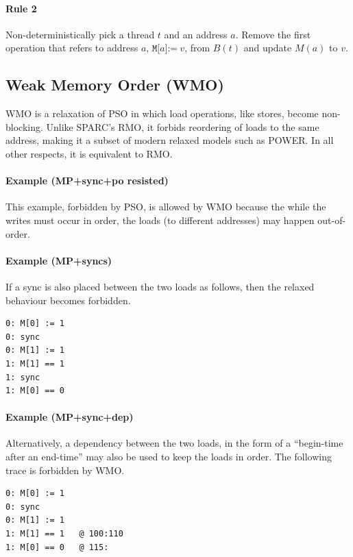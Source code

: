 \documentclass[11pt]{article}
\begin{document}
\paragraph{Rule 2}

Non-deterministically pick a thread $t$ and an address $a$.  Remove
the first operation that refers to address $a$,
$\texttt{M[}a\texttt{]:=}~v$, from $B(t)$ and update $M(a)$ to $v$.

\subsection{Weak Memory Order (WMO)}

WMO is a relaxation of PSO in which load operations, like stores,
become non-blocking.  Unlike SPARC's RMO, it forbids reordering of
loads to the same address, making it a subset of modern relaxed models
such as POWER.  In all other respects, it is equivalent to RMO.

\paragraph{Example (MP+sync+po resisted)} This example, forbidden by
PSO, is allowed by WMO because the while the writes must occur in
order, the loads (to different addresses) may happen out-of-order.

\paragraph{Example (MP+syncs)}  If a sync is also placed between the
two loads as follows, then the relaxed behaviour becomes forbidden.

\begin{verbatim}
0: M[0] := 1
0: sync
0: M[1] := 1
1: M[1] == 1
1: sync
1: M[0] == 0
\end{verbatim}

\paragraph{Example (MP+sync+dep)} Alternatively, a dependency between
the two loads, in the form of a ``begin-time after an end-time'' may
also be used to keep the loads in order.  The following trace is
forbidden by WMO.

\begin{verbatim}
0: M[0] := 1
0: sync
0: M[1] := 1
1: M[1] == 1   @ 100:110
1: M[0] == 0   @ 115:
\end{verbatim}
\end{document}
